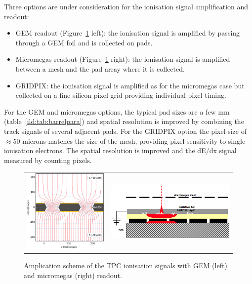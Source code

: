 Three options are under consideration for the ionisation signal amplification and readout:
\begin{itemize}
    \item GEM readout (Figure~\ref{fig:det:TPC_readout} left): the ionisation signal is amplified by passing through a GEM foil and is collected on pads.
    \item Micromegas readout (Figure~\ref{fig:det:TPC_readout} right): the ionisation signal is amplified between a mesh and the pad array where it is collected.
    \item GRIDPIX: the ionisation signal is amplified as for the micromegas case but collected on a fine silicon pixel grid providing individual pixel timing.
\end{itemize}
\vspace{0.5cm}
For the GEM and micromegas options, the typical pad sizes are a few mm (table~\ref{ild:tab:barrelpara}) and spatial resolution is improved by combining the track signals of several adjacent pads. For the GRIDPIX option the pixel size of $\approx$50 microns matches the size of the mesh, providing pixel sensitivity to single ionisation electrons. The spatial resolution is improved and the dE/dx signal measured by counting pixels. 

\begin{figure}[t!]
\begin{tabular}{cc}
\includegraphics[width=0.5\hsize,viewport={0 -10 600 500},clip]{Detector/fig/GEM.png} &
\includegraphics[width=0.4\hsize]{Detector/fig/micromegas.png}
\end{tabular}
\caption[TPC readout]{Amplication scheme of the TPC ionisation signals with GEM (left) and micromegas (right) readout.}
\label{fig:det:TPC_readout}
\end{figure}

